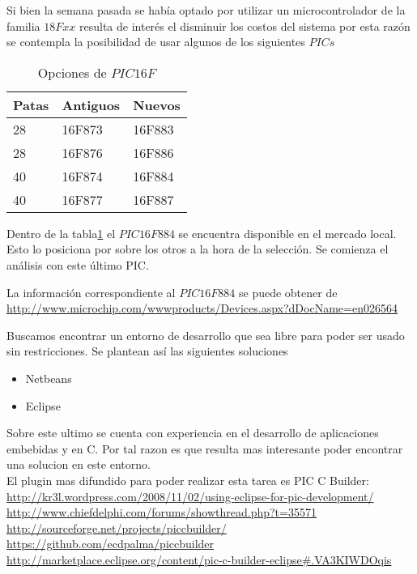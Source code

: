 Si bien la semana pasada se había optado por utilizar un microcontrolador de la familia $18Fxx$ 
resulta de interés el disminuir los costos del sistema por esta razón se contempla la posibilidad
de usar algunos de los siguientes $PICs$

\begin{table}[H]
    \begin{tabular}{l l l}
    \toprule
    \textbf{Patas} & \textbf{Antiguos} & \textbf{Nuevos} \\
    \toprule
    28 & 16F873 & 16F883\\
    28 & 16F876 & 16F886\\
    40 & 16F874 & 16F884\\
    40 & 16F877 & 16F887\\
    \bottomrule
    \end{tabular}
  \caption{Opciones de $PIC 16F$}
  \label{tab:comparacionPIC}
\end{table}

Dentro de la tabla\ref{tab:comparacionPIC} el $PIC16F884$ se encuentra disponible en el mercado local.
Esto lo posiciona por sobre los otros a la hora de la selección. Se comienza el análisis con este 
último PIC.

La información correspondiente al $PIC16F884$ se puede obtener de\\
\url{http://www.microchip.com/wwwproducts/Devices.aspx?dDocName=en026564}

Buscamos encontrar un entorno de desarrollo que sea libre para poder ser usado sin restricciones.
Se plantean así las siguientes soluciones
\begin{itemize}
 \item Netbeans
 \item Eclipse
\end{itemize}
Sobre este ultimo se cuenta con experiencia en el desarrollo de aplicaciones embebidas y en C. Por tal
razon es que resulta mas interesante poder encontrar una solucion en este entorno.\\
El plugin mas difundido para poder realizar esta tarea es PIC C Builder:\\
\url{http://kr3l.wordpress.com/2008/11/02/using-eclipse-for-pic-development/}\\
\url{http://www.chiefdelphi.com/forums/showthread.php?t=35571}\\
\url{http://sourceforge.net/projects/piccbuilder/}\\
\url{https://github.com/ecdpalma/piccbuilder}\\
\url{http://marketplace.eclipse.org/content/pic-c-builder-eclipse#.VA3KIWDOqis}\\

